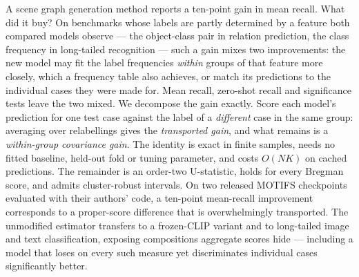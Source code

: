 A scene graph generation method reports a ten-point gain in mean recall. What did it buy? On
benchmarks whose labels are partly determined by a feature both compared models observe ---
the object-class pair in relation prediction, the class frequency in long-tailed recognition
--- such a gain mixes two improvements: the new model may fit the label frequencies
\emph{within} groups of that feature more closely, which a frequency table also achieves, or
match its predictions to the individual cases they were made for. Mean recall,
zero-shot recall and significance tests leave the two mixed.
We decompose the gain exactly. Score each model's prediction
for one test case against the label of a \emph{different} case in the same group: averaging
over relabellings gives the \emph{transported gain}, and what remains is a
\emph{within-group covariance gain}. The identity is exact in finite samples, needs no fitted baseline,
held-out fold or tuning parameter, and costs $O(NK)$ on cached predictions. The remainder is an order-two U-statistic, holds for every Bregman score,
and admits cluster-robust intervals. On two released MOTIFS
checkpoints evaluated with their authors' code, a ten-point mean-recall improvement
corresponds to a proper-score difference that is overwhelmingly transported. The unmodified estimator transfers to a frozen-CLIP variant and to
long-tailed image and text classification, exposing compositions aggregate scores hide ---
including a model that loses on every such measure yet discriminates individual cases
significantly better.
